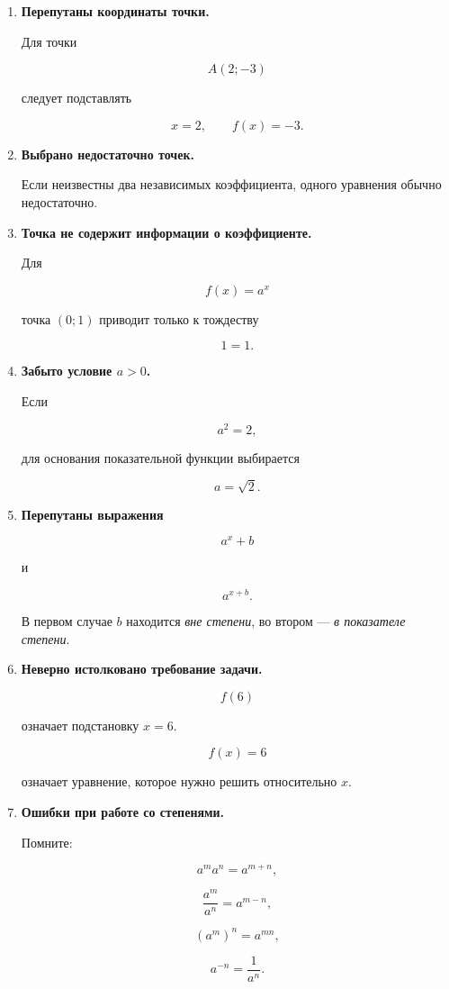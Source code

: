 \documentclass[a4paper,12pt]{article}
\newcommand{\key}[1]{\textcolor{darkaccent}{\textbf{#1}}}
\begin{document}
\begin{enumerate}[leftmargin=9mm,itemsep=3mm]

    \item \key{Перепутаны координаты точки.}

    Для точки

    \[
    A(2;-3)
    \]

    следует подставлять

    \[
    x=2,\qquad f(x)=-3.
    \]

    \item \key{Выбрано недостаточно точек.}

    Если неизвестны два независимых коэффициента, одного уравнения обычно недостаточно.

    \item \key{Точка не содержит информации о коэффициенте.}

    Для

    \[
    f(x)=a^x
    \]

    точка \((0;1)\) приводит только к тождеству

    \[
    1=1.
    \]

    \item \key{Забыто условие \(a>0\).}

    Если

    \[
    a^2=2,
    \]

    для основания показательной функции выбирается

    \[
    a=\sqrt2.
    \]

    \item \key{Перепутаны выражения}

    \[
    a^x+b
    \]

    и

    \[
    a^{x+b}.
    \]

    В первом случае \(b\) находится \emph{вне степени}, во втором --- \emph{в показателе степени}.

    \item \key{Неверно истолковано требование задачи.}

    \[
    f(6)
    \]

    означает подстановку \(x=6\).

    \[
    f(x)=6
    \]

    означает уравнение, которое нужно решить относительно \(x\).

    \item \key{Ошибки при работе со степенями.}

    Помните:

    \[
    a^m a^n=a^{m+n},
    \]

    \[
    \frac{a^m}{a^n}=a^{m-n},
    \]

    \[
    (a^m)^n=a^{mn},
    \]

    \[
    a^{-n}=\frac1{a^n}.
    \]

\end{enumerate}
\end{document}
